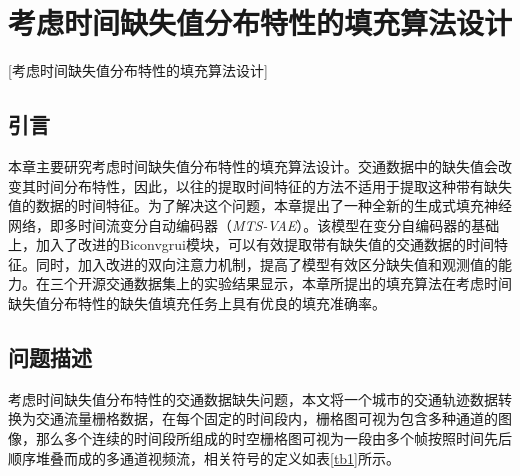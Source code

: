 
\chapter[考虑时间缺失值分布特性的填充算法设计]{考虑时间缺失值分布特性的填充算法设计}[考虑时间缺失值分布特性的填充算法设计]
\section{引言}
本章主要研究考虑时间缺失值分布特性的填充算法设计。交通数据中的缺失值会改变其时间分布特性，因此，以往的提取时间特征的方法不适用于提取这种带有缺失值的数据的时间特征。为了解决这个问题，本章提出了一种全新的生成式填充神经网络，即多时间流变分自动编码器（\textit{MTS-VAE}）。该模型在变分自编码器的基础上，加入了改进的Biconvgrui模块，可以有效提取带有缺失值的交通数据的时间特征。同时，加入改进的双向注意力机制，提高了模型有效区分缺失值和观测值的能力。在三个开源交通数据集上的实验结果显示，本章所提出的填充算法在考虑时间缺失值分布特性的缺失值填充任务上具有优良的填充准确率。


\section{问题描述} \label{sec3_2}
考虑时间缺失值分布特性的交通数据缺失问题，本文将一个城市的交通轨迹数据转换为交通流量栅格数据，在每个固定的时间段内，栅格图可视为包含多种通道的图像，那么多个连续的时间段所组成的时空栅格图可视为一段由多个帧按照时间先后顺序堆叠而成的多通道视频流，相关符号的定义如表\ref{tb1}所示。

